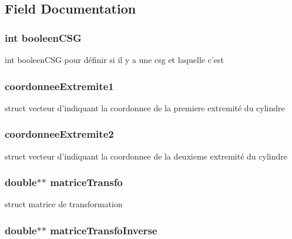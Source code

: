 \subsection{Field Documentation}
\hypertarget{structcylinder_a4428e32d4383f7dee25e5a4cb192da24}{
\subsubsection[{booleenCSG}]{\setlength{\rightskip}{0pt plus 5cm}int {\bf booleenCSG}}}
\label{structcylinder_a4428e32d4383f7dee25e5a4cb192da24}
int booleenCSG pour définir si il y a une csg et laquelle c'est \hypertarget{structcylinder_afb2be5d3ea17eb45de040c4ab9f15a38}{
\subsubsection[{coordonneeExtremite1}]{ {\bf coordonneeExtremite1}}}
\label{structcylinder_afb2be5d3ea17eb45de040c4ab9f15a38}
struct vecteur d'indiquant la coordonnee de la premiere extremité du cylindre \hypertarget{structcylinder_aa1d3b217682ad932e6211bfb18ebb259}{
\subsubsection[{coordonneeExtremite2}]{ {\bf coordonneeExtremite2}}}
\label{structcylinder_aa1d3b217682ad932e6211bfb18ebb259}
struct vecteur d'indiquant la coordonnee de la deuxieme extremité du cylindre \hypertarget{structcylinder_aa06ccc348007e3355beccf412f2f656c}{
\subsubsection[{matriceTransfo}]{\setlength{\rightskip}{0pt plus 5cm}double$\ast$$\ast$ {\bf matriceTransfo}}}
\label{structcylinder_aa06ccc348007e3355beccf412f2f656c}
struct matrice de transformation \hypertarget{structcylinder_acd7a3590501dcccfaefccbb658f83821}{
\subsubsection[{matriceTransfoInverse}]{\setlength{\rightskip}{0pt plus 5cm}double$\ast$$\ast$ {\bf matriceTransfoInverse}}}

